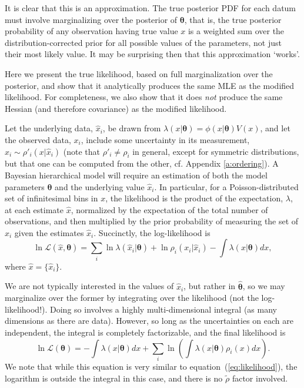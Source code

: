 \documentclass[a4paper,fleqn,usenatbib]{mnras}
\renewcommand{\L}{\mathcal{L}}
\newcommand{\eq}[1]{equation~(\ref{eq:#1})}
\newcommand{\para}{{\bm{\theta}}}
\begin{document}
It is clear that this is an approximation. The true posterior PDF for each datum must involve marginalizing over the posterior of $\para$, that is, the true posterior probability of any observation having true value $x$ is a weighted sum over the distribution-corrected prior for all possible values of the parameters, not just their most likely value.
It may be surprising then that this approximation `works'.

Here we present the true likelihood, based on full marginalization over the posterior, and show that it analytically produces the same MLE as the modified likelihood. 
For completeness, we also show that it does \textit{not} produce the same Hessian (and therefore covariance) as the modified likelihood.

Let the underlying data, $\hat{x}_i$, be drawn from $\lambda(x|\para) = \phi(x|\para)V(x)$, and let the observed data, $x_i$, include some uncertainty in its measurement, $x_i \sim \rho'_i(x|\hat{x}_i)$ (note that $\rho'_i \neq \rho_i$ in general, except for symmetric distributions, but that one can be computed from the other, cf. Appendix \ref{a:ordering}). 
A Bayesian hierarchical model will require an estimation of both the model parameters $\para$ and the underlying value $\hat x_i$. 
In particular, for a Poisson-distributed set of infinitesimal bins in $x$, the likelihood is the product of the expectation, $\lambda$, at each estimate $\hat{x}$, normalized by the expectation of the total number of observations, and then multiplied by the prior probability of measuring the set of $x_i$ given the estimates $\hat{x}_i$. Succinctly, the log-likelihood is
\begin{equation}
	\ln \L(\hat{x}, \para) = \sum_i \ln \lambda(\hat{x}_i|\para) + \ln \rho_i(x_i| \hat{x}_i) - \int \lambda(x|\para) dx,
\end{equation}
where $\hat{x}=\{\hat x_i\}$.

We are not typically interested in the values of $\hat{x}_i$, but rather in $\hat{\para}$, so we may marginalize over the former by integrating over the likelihood (not the log-likelihood!). 
Doing so involves a highly multi-dimensional integral (as many dimensions as there are data). 
However, so long as the uncertainties on each are independent, the integral is completely factorizable, and the final likelihood is
\begin{equation}
	\label{eq:full_likelihood}
 \ln \L(\para) = -\int \lambda(x|\para) dx + \sum_i \ln \left(\int \lambda(x|\para) \rho_i(x) dx \right).
\end{equation}
We note that while this equation is very similar to \eq{likelihood}, the logarithm is outside the integral in this case, and there is no $\tilde{\rho}$ factor involved.
\end{document}
